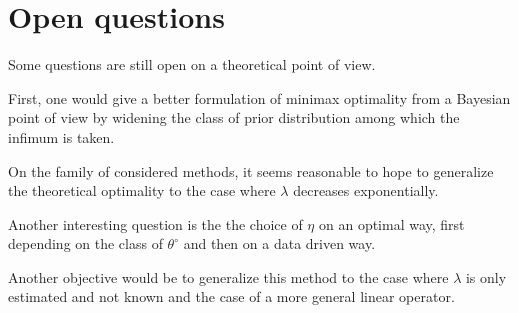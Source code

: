 \section{Open questions}\label{VI}
Some questions are still open on a theoretical point of view.

First, one would give a better formulation of minimax optimality from a Bayesian point of view by widening the class of prior distribution among which the infimum is taken.

On the family of considered methods, it seems reasonable to hope to generalize the theoretical optimality to the case where $\lambda$ decreases exponentially.

Another interesting question is the the choice of $\eta$ on an optimal way, first depending on the class of $\theta^{\circ}$ and then on a data driven way.

\medskip

Another objective would be to generalize this method to the case where $\lambda$ is only estimated and not known and the case of a more general linear operator.